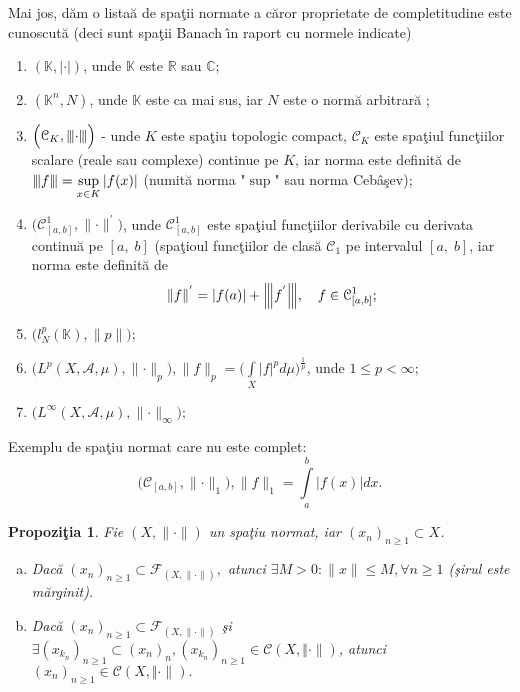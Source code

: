\documentclass[ a4paper, 12pt]{report}
\newtheorem{prop}[theorem]{\bf Propozi\c tia }
\theoremstyle{remark}
\numberwithin{equation}{section}
\begin{document}
Mai jos, d\u am o lista\u a de spa\c tii normate a c\u aror proprietate de completitudine este cunoscut\u a (deci sunt spa\c tii Banach \^\i n raport cu normele indicate)
\begin{enumerate}
\item $(\mathbb{K}, \lvert \cdot \rvert)$, unde $\mathbb{K}$ este $\mathbb{R}$ sau $\mathbb{C}$;
\item $(\mathbb{K}^{n}, N)$, unde $\mathbb{K}$ este ca mai sus, iar $N$ este o norm\u a arbitrar\u a ;
\item $\Big(\mathcal{C}_{K}, {\left\vert\kern-0.25ex\left\vert\kern-0.25ex\left\vert \cdot \right\vert\kern-0.25ex\right\vert\kern-0.25ex\right\vert}\Big)$ - unde $K$ este spa\c tiu topologic compact, $\mathcal{C}_{K}$ este spa\c tiul func\c tiilor scalare (reale sau complexe) continue pe $K$, iar norma este definit\u a de ${\left\vert\kern-0.25ex\left\vert\kern-0.25ex\left\vert f \right\vert\kern-0.25ex\right\vert\kern-0.25ex\right\vert} = \sup\limits_{x \in K} |f(x)|$ (numit\u a norma "$\sup$" sau norma Ceb\^ a\c sev);
\item $\Big(\mathcal{C}_{[a,b]}^{1}, \lVert \cdot \rVert^{'}\Big)$, unde  $\mathcal{C}_{[a,b]}^{1}$ este spa\c tiul func\c tiilor derivabile cu derivata continu\u a pe $[a, \; b]$ (spa\c tioul func\c tiilor de clas\u a $\mathcal{C}_1$ pe intervalul $[a, \; b]$, iar norma este definit\u a de 
    $$ \lVert f \rVert^{'} = \lvert f(a) \rvert + {\left\vert\kern-0.25ex\left\vert\kern-0.25ex\left\vert f^{'} \right\vert\kern-0.25ex\right\vert\kern-0.25ex\right\vert}, \quad f \in \mathcal{C}^1_{[a,b]};$$
\item $\Big(l_{N}^{p}(\mathbb{K}), \lVert p \rVert\Big);$
\item $\Big( L^{p}(X,\mathcal{A}, \mu), \lVert \cdot \rVert_{p}  \Big), \lVert f \rVert_{p} = \Big( \int\limits_{X} \lvert f \rvert^{p} d\mu \Big )^{\frac{1}{p}}$, unde $1 \leq p < \infty;$
\item $\Big(  L^{\infty}(X,\mathcal{A},\mu), \lVert \cdot \rVert_{\infty}\Big);$
\end{enumerate}
Exemplu de spa\c tiu normat care nu este complet:
\[ \Big(\mathcal{C}_{[a,b]}, \lVert \cdot \rVert_{1} \Big), \lVert f \rVert_{1} = \int\limits_{a}^{b}\lvert f(x) \rvert dx.\]
\begin{prop}
Fie $(X, \lVert \cdot \rVert)$ un spa\c tiu normat, iar $(x_n)_{n \geq 1} \subset X$.
\begin{enumerate}[(a)]
\item Dac\u a $(x_n)_{n \geq 1} \subset \mathcal{F}_{(X, \lVert \cdot \rVert)},$ atunci $\exists M>0: \lVert x \rVert \leq M, \forall n \geq 1$ (\c sirul este m\u arginit).
\item Dac\u a  $(x_n)_{n \geq 1} \subset \mathcal{F}_{(X, \lVert \cdot \rVert)}$ \c si $\exists (x_{k_n})_{n \geq 1} \subset (x_n)_n,(x_{k_n})_{n \geq 1} \in \mathcal{C}{(X, \Vert \cdot \rVert)}$, atunci $(x_n)_{n \geq 1} \in \mathcal{C}{(X, \Vert \cdot \rVert)}.$
\end{enumerate}
\end{prop}
\end{document}
